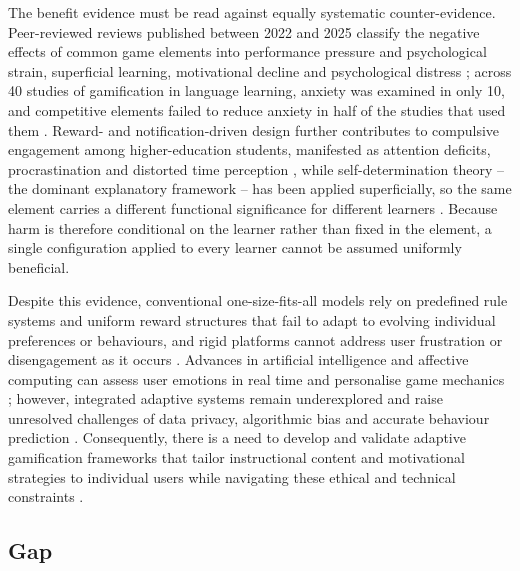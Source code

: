 \documentclass[12pt,a4paper]{article}
\begin{document}
\begin{justify}
The benefit evidence must be read against equally systematic counter-evidence.
Peer-reviewed reviews published between 2022 and 2025 classify the negative effects
of common game elements into performance pressure and psychological strain,
superficial learning, motivational decline and psychological distress
\parencite{nugroho2025negative}; across 40 studies of gamification in language
learning, anxiety was examined in only 10, and competitive elements failed to reduce
anxiety in half of the studies that used them \parencite{edwards2022anxiety}.
Reward- and notification-driven design further contributes to compulsive engagement
among higher-education students, manifested as attention deficits, procrastination and
distorted time perception \parencite{gul2026brainrot}, while self-determination theory
-- the dominant explanatory framework -- has been applied superficially, so the same
element carries a different functional significance for different learners
\parencite{gao2024sdt}. Because harm is therefore conditional on the learner rather
than fixed in the element, a single configuration applied to every learner cannot be
assumed uniformly beneficial.

Despite this evidence, conventional one-size-fits-all models rely on predefined rule
systems and uniform reward structures that fail to adapt to evolving individual
preferences or behaviours, and rigid platforms cannot address user frustration or
disengagement as it occurs
\parencite{farhan2023machine,shabadurai2025reinforcement,zourmpakis2023adaptive,naseer2025game}.
Advances in artificial intelligence and affective computing can assess user emotions
in real time and personalise game mechanics
\parencite{vistorte2024integrating,farhan2023machine}; however, integrated adaptive
systems remain underexplored and raise unresolved challenges of data privacy,
algorithmic bias and accurate behaviour prediction
\parencite{farhan2023machine,vistorte2024integrating}. Consequently, there is a need
to develop and validate adaptive gamification frameworks that tailor instructional
content and motivational strategies to individual users while navigating these
ethical and technical constraints
\parencite{farhan2023machine,naseer2025game,shabadurai2025reinforcement}.

\subsection{Gap}


\end{justify}
\end{document}
